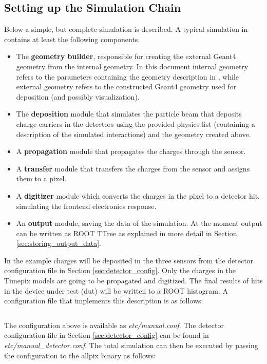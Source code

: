\subsection{Setting up the Simulation Chain}
\label{sec:setting_up_simulation_chain}
Below a simple, but complete simulation is described. A typical simulation in \apsq contains at least the following components.
\begin{itemize}

\item The \textbf{geometry builder}, responsible for creating the external Geant4 geometry from the internal geometry. In this document internal geometry refers to the parameters containing the geometry description in \apsq, while external geometry refers to the constructed Geant4 geometry used for deposition (and possibly visualization).
\item The \textbf{deposition} module that simulates the particle beam that deposits charge carriers in the detectors using the provided physics list (containing a description of the simulated interactions) and the geometry created above.
\item A \textbf{propagation} module that propagates the charges through the sensor.
\item A \textbf{transfer} module that transfers the charges from the sensor and assigns them to a pixel. 
\item A \textbf{digitizer} module which converts the charges in the pixel to a detector hit, simulating the frontend electronics response.
\item An \textbf{output} module, saving the data of the simulation. At the moment output can be written as ROOT TTree as explained in more detail in Section \ref{sec:storing_output_data}.
\end{itemize}

In the example charges will be deposited in the three sensors from the detector configuration file in Section \ref{sec:detector_config}. Only the charges in the Timepix models are going to be propagated and digitized. The final results of hits in the device under test (dut) will be written to a ROOT histogram. A configuration file that implements this description is as follows:
\inputminted[frame=single,framesep=3pt,breaklines=true,tabsize=2,linenos]{ini}{../../etc/manual.conf}

The configuration above is available as \textit{etc/manual.conf}. The detector configuration file in Section \ref{sec:detector_config} can be found in \textit{etc/manual\_detector.conf}. The total simulation can then be executed by passing the configuration to the allpix binary as follows:

